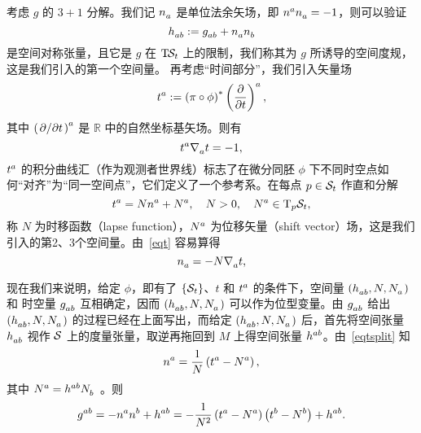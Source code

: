 		考虑 $g$ 的 $3+1$ 分解。我们记 $\tensor{n}{_a}$ 是单位法余矢场，即 $\tensor{n}{^a} \tensor{n}{_a} = -1$，则可以验证
		\begin{equation}
			\tensor{h}{_a_b} \definedby \tensor{g}{_a_b} + \tensor{n}{_a} \tensor{n}{_b}
		\end{equation}
		是空间对称张量，且它是 $g$ 在 $\mathrm{T}_{{}}\!{\mathcal{S}_t}$ 上的限制，我们称其为 $g$ 所诱导的空间度规，这是我们引入的第一个空间量。%
		再考虑“时间部分”，我们引入矢量场
		\begin{equation}
			\tensor{t}{^a} \definedby \left( \pi \circ \phi \right)^* \tensor{\left( \pdv{t} \right)}{^a},
		\end{equation}
		其中 $\tensor{\left( \pdv*{t} \right)}{^a}$ 是 $\mathbb{R}$ 中的自然坐标基矢场。则有
		\begin{equation}
			\tensor{t}{^a} \Nabla{a} t = -1, \label{eqt}
		\end{equation}
		$\tensor{t}{^a}$ 的积分曲线汇（作为观测者世界线）标志了在微分同胚 $\phi$ 下不同时空点如何“对齐”为“同一空间点”，它们定义了一个参考系。在每点 $p\in \mathcal{S}_t$ 作直和分解
		\begin{equation}
			\tensor{t}{^a} = N \tensor{n}{^a} + \tensor{N}{^a} \qc N>0 \qc \tensor{N}{^a} \in \TBx[p]{\spc_t}, \label{eqtsplit}
		\end{equation}
		称 $N$ 为时移函数（lapse function），$\tensor{N}{^a}$ 为位移矢量（shift vector）场，这是我们引入的第2、3个空间量。由~\eqref{eqt} 容易算得
		\begin{equation}
			\tensor{n}{_a} = - N \Nabla{a} t, \label{eqn}
		\end{equation}


		现在我们来说明，给定 $\phi$，即有了 $\left\{ \mathcal{S}_t \right\}$、$t$ 和 $\tensor{t}{^a}$ 的条件下，空间量 $\left( \tensor{h}{_a_b} , N, \tensor{N}{_a} \right)$ 和 时空量 $\tensor{g}{_a_b}$ 互相确定，因而 $\left( \tensor{h}{_a_b} , N, \tensor{N}{_a} \right)$ 可以作为位型变量。由 $\tensor{g}{_a_b}$ 给出 $\left( \tensor{h}{_a_b} , N, \tensor{N}{_a} \right)$ 的过程已经在上面写出，而给定 $\left( \tensor{h}{_a_b} , N, \tensor{N}{_a} \right)$ 后，首先将空间张量 $\tensor{h}{_a_b}$ 视作 $\mathcal{S}$ 上的度量张量，取逆再拖回到 $M$ 上得空间张量 $\tensor{h}{^a^b}$。由~\eqref{eqtsplit} 知
		\begin{equation}
			\tensor{n}{^a} = \frac{1}{N} \left( \tensor{t}{^a} - \tensor{N}{^a} \right),
		\end{equation}
		其中 $\tensor{N}{^a} = \tensor{h}{^a^b} \tensor{N}{_b}$ 。则
		\begin{equation}
			\tensor{g}{^a^b} = -\tensor{n}{^a} \tensor{n}{^b} + \tensor{h}{^a^b} = - \frac{1}{N^2} \left( \tensor{t}{^a} - \tensor{N}{^a} \right) \left( \tensor{t}{^b} - \tensor{N}{^b} \right) + \tensor{h}{^a^b}.
		\end{equation}

